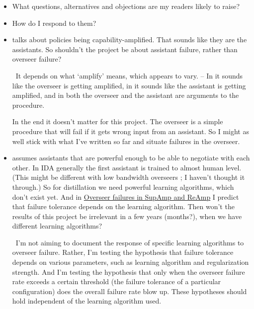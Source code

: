 \documentclass{farlamp}
\begin{document}
\begin{itemize}
\item What questions, alternatives and objections are my readers likely to
    raise?
\item How do I respond to them?
\end{itemize}

\begin{itemize}
    \item \cite{ChriRelAmp} talks about policies being capability-amplified.
        That sounds like they are the assistants. So shouldn't the project be
        about assistant failure, rather than overseer failure?

        \Response\ It depends on what ‘amplify’ means, which appears to vary. –
        In \cite{ChriALBA} it sounds like the overseer is getting amplified, in
        \cite{ChriCapAmp} it sounds like the assistant is getting amplified, and
        in \cite{CotrIDA} both the overseer and the assistant are arguments to
        the  procedure.

        In the end it doesn't matter for this project. The overseer is a simple
        procedure that will fail if it gets wrong input from an assistant. So I
        might as well stick with what I've written so far and situate failures
        in the overseer.

    \item \cite{ChriRelAmp} assumes assistants that are powerful enough to be
        able to negotiate with each other. In IDA generally the first assistant
        is trained to almost human level. (This might be different with low
        bandwidth overseers \parencite{SaunUndIDAClOv}; I haven't thought it
        through.) So for distillation we need powerful learning algorithms,
        which don't exist yet. And in
        \href{https://github.com/rmoehn/farlamp/blob/master/overfail2.pdf}{Overseer
        failures in SupAmp and ReAmp} I predict that failure tolerance depends
        on the learning algorithm. Then won't the results of this project be
        irrelevant in a few years (months?), when we have different learning
        algorithms?

        \Response\ I'm not aiming to document the response of specific learning
        algorithms to overseer failure. Rather, I'm testing the hypothesis that
        failure tolerance depends on various parameters, such as learning
        algorithm and regularization strength. And I'm testing the hypothesis
        that only when the overseer failure rate exceeds a certain threshold
        (the failure tolerance of a particular configuration) does the overall
        failure rate blow up. These hypotheses should hold independent of the
        learning algorithm used.
\end{itemize}
\end{document}
